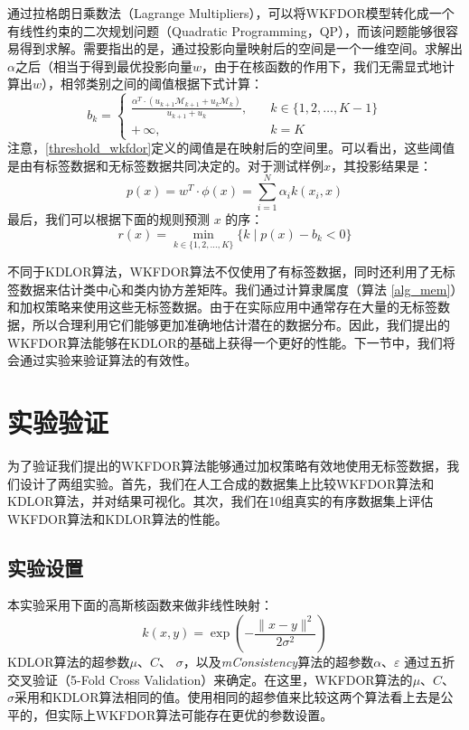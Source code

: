 通过拉格朗日乘数法（Lagrange Multipliers），可以将WKFDOR模型转化成一个有线性约束的二次规划问题（Quadratic Programming，QP），而该问题能够很容易得到求解。需要指出的是，通过投影向量映射后的空间是一个一维空间。求解出\(\alpha\)之后（相当于得到最优投影向量\(w\)，由于在核函数的作用下，我们无需显式地计算出\(w\)），相邻类别之间的阈值根据下式计算：
\begin{equation}
\label{threshold_wkfdor}
b_{k}=\begin{cases}
\frac{\alpha^{T} \cdot (u_{k+1} \mathcal{M}_{k+1} + u_{k} \mathcal{M}_{k})}{u_{k+1}+u_{k}},\quad &k \in \{1,2,\dots,K-1\} \\
+\,\infty,\quad &k=K
\end{cases}
\end{equation}
注意，\autoref{threshold_wkfdor}定义的阈值是在映射后的空间里。可以看出，这些阈值是由有标签数据和无标签数据共同决定的。对于测试样例\(x\)，其投影结果是：
\begin{equation}
\label{projResult_wkfdor}
p(x)=w^{T} \cdot \phi(x)=\sum_{i=1}^{N} \alpha_{i} k(x_{i},x)
\end{equation}
最后，我们可以根据下面的规则预测 \(x\) 的序：
\begin{equation}
\label{rank_rule_wkfdor}
r(x)=\min \limits_{k \in \{1,2,\dots,K\}} \{k\mid p(x)-b_{k}<0\}
\end{equation}

不同于KDLOR算法，WKFDOR算法不仅使用了有标签数据，同时还利用了无标签数据来估计类中心和类内协方差矩阵。我们通过计算隶属度（算法 \ref{alg_mem}）和加权策略来使用这些无标签数据。由于在实际应用中通常存在大量的无标签数据，所以合理利用它们能够更加准确地估计潜在的数据分布。因此，我们提出的WKFDOR算法能够在KDLOR的基础上获得一个更好的性能。下一节中，我们将会通过实验来验证算法的有效性。

\section{实验验证}
为了验证我们提出的WKFDOR算法能够通过加权策略有效地使用无标签数据，我们设计了两组实验。首先，我们在人工合成的数据集上比较WKFDOR算法和KDLOR算法，并对结果可视化。其次，我们在10组真实的有序数据集上评估WKFDOR算法和KDLOR算法的性能。

\subsection{实验设置}
\label{wkfdor_expSet}
本实验采用下面的高斯核函数来做非线性映射：
\begin{equation}
\label{Gaussian_kernel}
k(x,y)=\exp \left ( -\frac{\parallel x-y \parallel^{2}}{2\sigma^{2}} \right )
\end{equation}
KDLOR算法的超参数\(\mu\)、\(C\)、 \(\sigma\)，以及\textit{mConsistency}算法的超参数\(\alpha\)、\(\varepsilon\) 通过五折交叉验证（5-Fold Cross Validation）来确定。在这里，WKFDOR算法的\(\mu\)、\(C\)、 \(\sigma\)采用和KDLOR算法相同的值。使用相同的超参值来比较这两个算法看上去是公平的，但实际上WKFDOR算法可能存在更优的参数设置。

